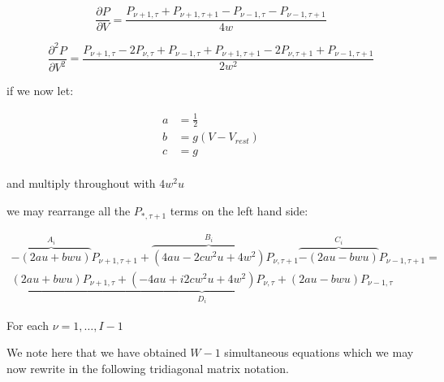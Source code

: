 \documentclass[10pt]{article}
\begin{document}
\begin{equation}
    \frac{\partial P}{\partial V} = 
    \frac{P_{\nu +1,\tau } + P_{\nu +1,\tau +1 } -
    P_{\nu - 1,\tau } - P_{\nu -1,\tau +1}} 
    {4w}
\end{equation}

\begin{equation}
    \frac{\partial^2 P}{\partial V^2} = 
    \frac{P_{\nu+1,\tau} - 2 P_{\nu,\tau} + P_{\nu-1,\tau} +
    P_{\nu+1,\tau+1} - 2 P_{\nu,\tau+1} + P_{\nu-1,\tau+1}}
    {2w^2}
\end{equation}

if we now let:

\begin{align*}
a &= \frac{1}{2} \\
b &= g(V - V_{rest}) \\
c &= g \\
\end{align*}

and multiply throughout with $4w^2u$

we may rearrange all the $P_{*,\tau+1} $ terms on the left hand side:

\begin{multline}
    \overbrace{-(2au+bwu)}^{A_i} P_{\nu+1,\tau+1} + 
    \overbrace{(4au - 2cw^2u + 4w^2)}^{B_i} P_{\nu,\tau+1}
    \overbrace{-(2au-bwu)}^{C_i} P_{\nu-1,\tau+1}
    =  \\
    \underbrace{(2au+bwu) P_{\nu+1,\tau} +  
    (-4au +i  2cw^2u + 4w^2) P_{\nu,\tau} + 
    (2au-bwu) P_{\nu-1,\tau}}_{D_i}
\end{multline}

For each $ \nu = 1 , \dots , I-1 $

We note here that we have obtained $W-1$ simultaneous equations which
we may now rewrite in the following tridiagonal matrix notation.
\end{document}
